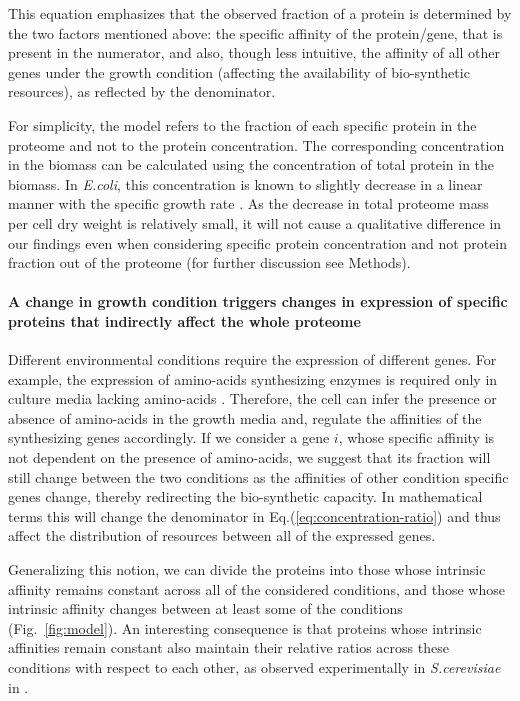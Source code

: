 \documentclass[10pt,letterpaper]{article}
\begin{document}
This equation emphasizes that the observed fraction of a protein is determined by the two factors mentioned above: the specific affinity of the protein/gene, that is present in the numerator, and also, though less intuitive, the affinity of all other genes under the growth condition (affecting the availability of bio-synthetic resources), as reflected by the denominator.

For simplicity, the model refers to the fraction of each specific protein in the proteome and not to the protein concentration.
The corresponding concentration in the biomass can be calculated using the concentration of total protein in the biomass.
In \emph{E.coli}, this concentration is known to slightly decrease in a linear manner with the specific growth rate \cite{Bremer1987,Valgepea2013,Scott2014}.
As the decrease in total proteome mass per cell dry weight is relatively small, it will not cause a qualitative difference in our findings even when considering specific protein concentration and not protein fraction out of the proteome (for further discussion see Methods).


\paragraph{A change in growth condition triggers changes in expression of specific proteins that indirectly affect the whole proteome}

Different environmental conditions require the expression of different genes.
For example, the expression of amino-acids synthesizing enzymes is required only in culture media lacking amino-acids \cite{24656150,10515934}.
Therefore, the cell can infer the presence or absence of amino-acids in the growth media and, regulate the affinities of the synthesizing genes accordingly.
If we consider a gene $i$, whose specific affinity is not dependent on the presence of amino-acids, we suggest that its fraction will still change between the two conditions as the affinities of other condition specific genes change, thereby redirecting the bio-synthetic capacity.
In mathematical terms this will change the denominator in Eq.(\ref{eq:concentration-ratio}) and thus affect the distribution of resources between all of the expressed genes.


Generalizing this notion, we can divide the proteins into those whose intrinsic affinity remains constant across all of the considered conditions, and those whose intrinsic affinity changes between at least some of the conditions (Fig.~\ref{fig:model}).
An interesting consequence is that proteins whose intrinsic affinities remain constant also maintain their relative ratios across these conditions with respect to each other, as observed experimentally in \emph{S.cerevisiae} in \cite{Keren2013}.
\end{document}
